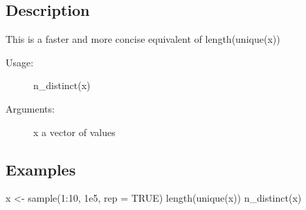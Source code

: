 \subsection{Description}
This is a faster and more concise equivalent of length(unique(x))


\begin{description}
\item[Usage:] n_distinct(x)

\item[Arguments:] x a vector of values
\end{description}
\subsection{Examples}

x <- sample(1:10, 1e5, rep = TRUE)
length(unique(x))
n_distinct(x)

